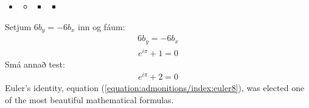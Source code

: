\documentclass[a4paper,10pt,icelandic]{sphinxmanual}
\begin{document}
\begin{sphinxShadowBox}
\begin{itemize}
\item {} 
\sphinxAtStartPar
{}\label{\detokenize{admonitions/index:id1}}{\hyperref[\detokenize{admonitions/index:header-two}]{}}
\begin{itemize}
\item {} 
\sphinxAtStartPar
{}\label{\detokenize{admonitions/index:id2}}{\hyperref[\detokenize{admonitions/index:header-three}]{}}
\begin{itemize}
\item {} 
\sphinxAtStartPar
{}\label{\detokenize{admonitions/index:id3}}{\hyperref[\detokenize{admonitions/index:header-four}]{}}
\begin{itemize}
\item {} 
\sphinxAtStartPar
{}\label{\detokenize{admonitions/index:id4}}{\hyperref[\detokenize{admonitions/index:header-five}]{}}

\end{itemize}

\end{itemize}

\end{itemize}

\end{itemize}
\end{sphinxShadowBox}

\sphinxAtStartPar
Setjum \(6b_y=-6b_x\) inn og fáum:
\begin{equation*}
\begin{split}6b_y = -6b_x\end{split}
\end{equation*}\begin{equation}\label{equation:admonitions/index:euler7}
\begin{split}e^{i\pi} + 1 = 0\end{split}
\end{equation}
\ignorespaces 
\sphinxAtStartPar
Smá annað test:
\begin{equation}\label{equation:admonitions/index:euler8}
\begin{split}e^{i\pi} + 2 = 0\end{split}
\end{equation}
\sphinxAtStartPar
Euler’s identity, equation (\ref{equation:admonitions/index:euler8}), was elected one of the most
beautiful mathematical formulas.
\end{document}
